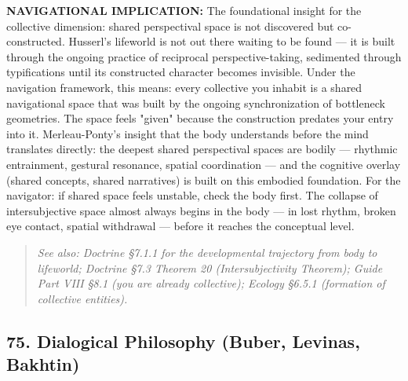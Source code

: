 \textbf{NAVIGATIONAL IMPLICATION:} The foundational insight for the collective dimension: shared perspectival space is not discovered but co-constructed. Husserl's lifeworld is not out there waiting to be found — it is built through the ongoing practice of reciprocal perspective-taking, sedimented through typifications until its constructed character becomes invisible. Under the navigation framework, this means: every collective you inhabit is a shared navigational space that was built by the ongoing synchronization of bottleneck geometries. The space feels "given" because the construction predates your entry into it. Merleau-Ponty's insight that the body understands before the mind translates directly: the deepest shared perspectival spaces are bodily — rhythmic entrainment, gestural resonance, spatial coordination — and the cognitive overlay (shared concepts, shared narratives) is built on this embodied foundation. For the navigator: if shared space feels unstable, check the body first. The collapse of intersubjective space almost always begins in the body — in lost rhythm, broken eye contact, spatial withdrawal — before it reaches the conceptual level.


\begin{quote}
\itshape
\textit{See also: Doctrine §7.1.1 for the developmental trajectory from body to lifeworld; Doctrine §7.3 Theorem 20 (Intersubjectivity Theorem); Guide Part VIII §8.1 (you are already collective); Ecology §6.5.1 (formation of collective entities).}
\end{quote}


\bigskip\noindent\makebox[\textwidth]{\color{rulegray}\rule{5cm}{0.3pt}}\bigskip


\subsection*{75. Dialogical Philosophy (Buber, Levinas, Bakhtin)}


